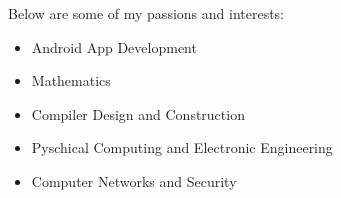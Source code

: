     \noindent
    Below are some of my passions and interests:
    \begin{itemize}
        \item Android App Development
        \item Mathematics
        \item Compiler Design and Construction
        \item Pyschical Computing and Electronic Engineering
        \item Computer Networks and Security
    \end{itemize}

